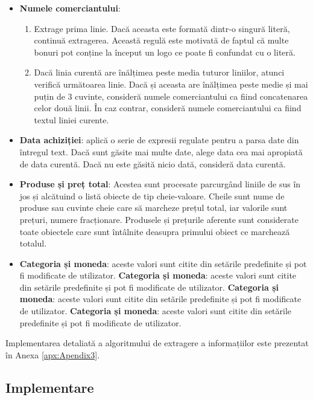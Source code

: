 \begin{itemize}
  \item
  \textbf{Numele comerciantului}:
  \begin{enumerate}
      \item
      Extrage prima linie. Dacă aceasta este formată dintr-o singură literă, continuă extragerea. Această regulă este motivată de faptul că multe bonuri pot conține la început un logo ce poate fi confundat cu o literă.
      \item
      Dacă linia curentă are înălțimea peste media tuturor liniilor, atunci verifică următoarea linie. Dacă și aceasta are înălțimea peste medie și mai puțin de 3 cuvinte, consideră numele comerciantului ca fiind concatenarea celor două linii. În caz contrar, consideră numele comerciantului ca fiind textul liniei curente.
  \end{enumerate}
  \item
  \textbf{Data achiziției}: aplică o serie de expresii regulate pentru a parsa date din întregul text. Dacă sunt găsite mai multe date, alege data cea mai apropiată de data curentă. Dacă nu este găsită nicio dată, consideră data curentă.
  \item
  \textbf{Produse și preț total}: Acestea sunt procesate parcurgând liniile de sus în jos și alcătuind o listă obiecte de tip cheie-valoare. Cheile sunt nume de produse sau cuvinte cheie care să marcheze prețul total, iar valorile sunt prețuri, numere fracționare. Produsele și prețurile aferente sunt considerate toate obiectele care sunt întâlnite deasupra primului obiect ce marchează totalul.
  \item
  \textbf{Categoria și moneda}: aceste valori sunt citite din setările predefinite și pot fi modificate de utilizator.
  \textbf{Categoria și moneda}: aceste valori sunt citite din setările predefinite și pot fi modificate de utilizator.
  \textbf{Categoria și moneda}: aceste valori sunt citite din setările predefinite și pot fi modificate de utilizator.
  \textbf{Categoria și moneda}: aceste valori sunt citite din setările predefinite și pot fi modificate de utilizator.
\end{itemize}

Implementarea detaliată a algoritmului de extragere a informațiilor este prezentat în Anexa \ref{apx:Apendix3}.

\subsection{Implementare}

